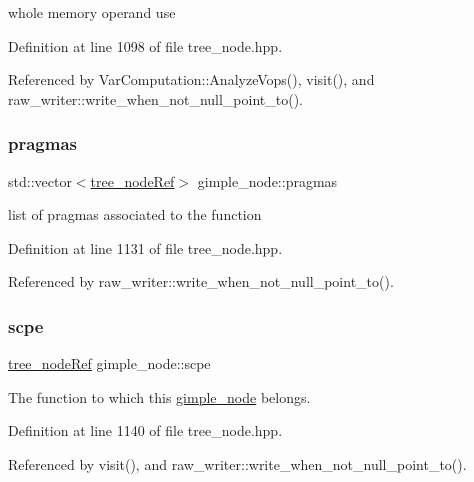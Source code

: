 whole memory operand use 



Definition at line 1098 of file tree\+\_\+node.\+hpp.



Referenced by Var\+Computation\+::\+Analyze\+Vops(), visit(), and raw\+\_\+writer\+::write\+\_\+when\+\_\+not\+\_\+null\+\_\+point\+\_\+to().

\mbox{\label{structgimple__node_ab07629fae46b91a4c68a596da2b10ebe}} 
\subsubsection{\texorpdfstring{pragmas}{pragmas}}
{\footnotesize\ttfamily std\+::vector$<$\hyperlink{tree__node_8hpp_a6ee377554d1c4871ad66a337eaa67fd5}{tree\+\_\+node\+Ref}$>$ gimple\+\_\+node\+::pragmas}



list of pragmas associated to the function 



Definition at line 1131 of file tree\+\_\+node.\+hpp.



Referenced by raw\+\_\+writer\+::write\+\_\+when\+\_\+not\+\_\+null\+\_\+point\+\_\+to().

\mbox{\label{structgimple__node_aa58e5fa606b99e64861662ba81f0949c}} 
\subsubsection{\texorpdfstring{scpe}{scpe}}
{\footnotesize\ttfamily \hyperlink{tree__node_8hpp_a6ee377554d1c4871ad66a337eaa67fd5}{tree\+\_\+node\+Ref} gimple\+\_\+node\+::scpe}



The function to which this \hyperlink{structgimple__node}{gimple\+\_\+node} belongs. 



Definition at line 1140 of file tree\+\_\+node.\+hpp.



Referenced by visit(), and raw\+\_\+writer\+::write\+\_\+when\+\_\+not\+\_\+null\+\_\+point\+\_\+to().

